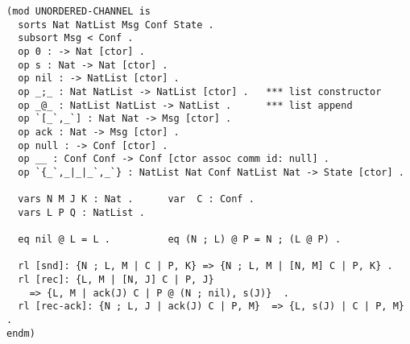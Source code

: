 \documentclass{article}
\begin{document}
\begin{lstlisting}[style=AMMA, language=Maude, numbers=none]
(mod UNORDERED-CHANNEL is
  sorts Nat NatList Msg Conf State .
  subsort Msg < Conf .
  op 0 : -> Nat [ctor] .
  op s : Nat -> Nat [ctor] .
  op nil : -> NatList [ctor] .
  op _;_ : Nat NatList -> NatList [ctor] .   *** list constructor
  op _@_ : NatList NatList -> NatList .      *** list append
  op `[_`,_`] : Nat Nat -> Msg [ctor] .
  op ack : Nat -> Msg [ctor] .
  op null : -> Conf [ctor] .
  op __ : Conf Conf -> Conf [ctor assoc comm id: null] .
  op `{_`,_|_|_`,_`} : NatList Nat Conf NatList Nat -> State [ctor] .

  vars N M J K : Nat .      var  C : Conf .
  vars L P Q : NatList .

  eq nil @ L = L .          eq (N ; L) @ P = N ; (L @ P) . 

  rl [snd]: {N ; L, M | C | P, K} => {N ; L, M | [N, M] C | P, K} .     
  rl [rec]: {L, M | [N, J] C | P, J}  
    => {L, M | ack(J) C | P @ (N ; nil), s(J)}  .
  rl [rec-ack]: {N ; L, J | ack(J) C | P, M}  => {L, s(J) | C | P, M} .
endm)
\end{lstlisting}
\end{document}
